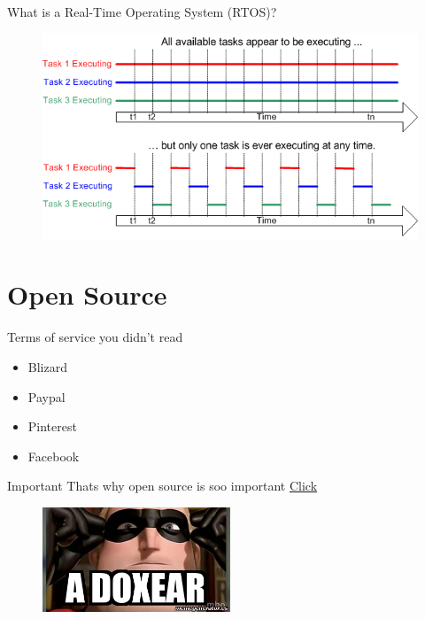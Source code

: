 \documentclass[10pt]{beamer}
\begin{document}
\begin{frame}{What is a Real-Time Operating System (RTOS)?}
    \begin{figure}[h]
      \centering
      \includegraphics[width=1.0\textwidth]{figures/Timing.png}
      \label{fig:my_label}
    \end{figure}
\end{frame}

\section{Open Source}
    \begin{frame}{Terms of service you didn't read }
      \begin{itemize}
        \item Blizard
        \item Paypal
        \item Pinterest
        \item Facebook
      \end{itemize}
      \begin{alertblock}{Important}
        Thats why open source is soo important \newline
        \href{https://tosdr.org/}{Click}
      \end{alertblock}
      \begin{figure}[h]
        \centering
        \includegraphics[width=0.5\textwidth]{figures/DoxingMeme.jpg}
        \label{fig:my_label}
        \end{figure}
    \end{frame}
\end{document}

